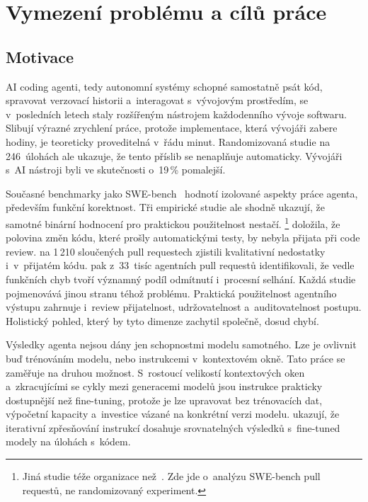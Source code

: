 \chapter{Vymezení problému a cílů práce}
\label{kap:vymezeni}

\section{Motivace}

AI coding agenti, tedy autonomní systémy schopné samostatně psát
kód, spravovat verzovací historii a~interagovat s~vývojovým
prostředím, se v~posledních letech staly rozšířeným nástrojem
každodenního vývoje softwaru. Slibují výrazné zrychlení práce, protože
implementace, která vývojáři zabere hodiny, je teoreticky proveditelná
v~řádu minut. Randomizovaná studie \textcite{metr2025}
na 246~úlohách ale ukazuje, že tento příslib se nenaplňuje
automaticky. Vývojáři s~AI nástroji byli ve skutečnosti
o~19\,\% pomalejší.

Současné benchmarky jako SWE-bench~\cite{swebench2024} hodnotí
izolované aspekty práce agenta, především funkční korektnost. Tři
empirické studie ale shodně ukazují, že samotné binární hodnocení
pro praktickou použitelnost nestačí. \textcite{metr2026}\footnote{Jiná
studie téže organizace než~\cite{metr2025}. Zde jde o~analýzu SWE-bench
pull requestů, ne randomizovaný experiment.} doložila, že polovina
změn kódu, které prošly automatickými testy, by nebyla přijata při code
review. \textcite{li2026beyondbugfixes} na 1\,210 sloučených
pull requestech zjistili kvalitativní nedostatky i~v~přijatém kódu.
\textcite{ehsani2026failedprs} pak z~33~tisíc agentních
pull requestů identifikovali, že vedle funkčních chyb tvoří významný
podíl odmítnutí i~procesní selhání. Každá studie pojmenovává jinou
stranu téhož problému. Praktická použitelnost agentního výstupu
zahrnuje i~review přijatelnost, udržovatelnost a~auditovatelnost
postupu. Holistický pohled, který by tyto dimenze zachytil společně,
dosud chybí.

Výsledky agenta nejsou dány jen schopnostmi modelu samotného. Lze je
ovlivnit buď trénováním modelu, nebo instrukcemi v~kontextovém okně.
Tato práce se zaměřuje na druhou možnost. S~rostoucí velikostí
kontextových oken a~zkracujícími se cykly mezi generacemi modelů jsou
instrukce prakticky dostupnější než fine-tuning, protože je lze upravovat bez
trénovacích dat, výpočetní kapacity a~investice vázané na konkrétní
verzi modelu. \textcite{shin2025prompt} ukazují, že iterativní
zpřesňování instrukcí dosahuje srovnatelných výsledků s~fine-tuned
modely na úlohách s~kódem.


